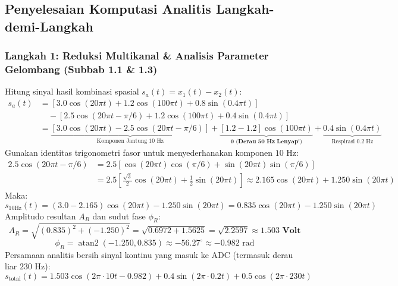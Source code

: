 \documentclass[11pt,a4paper]{article}
\begin{document}
\newpage
\subsection{Penyelesaian Komputasi Analitis Langkah-demi-Langkah}

\subsubsection{Langkah 1: Reduksi Multikanal \& Analisis Parameter Gelombang (Subbab 1.1 \& 1.3)}
Hitung sinyal hasil kombinasi spasial $s_a(t) = x_1(t) - x_2(t)$:
\begin{align*}
s_a(t) &= \left[ 3.0 \cos(20\pi t) + 1.2 \cos(100\pi t) + 0.8 \sin(0.4\pi t) \right] \\
&\quad - \left[ 2.5 \cos(20\pi t - \pi/6) + 1.2 \cos(100\pi t) + 0.4 \sin(0.4\pi t) \right] \\
&= \underbrace{\left[ 3.0 \cos(20\pi t) - 2.5 \cos(20\pi t - \pi/6) \right]}_{\text{Komponen Jantung 10 Hz}} + \underbrace{[1.2 - 1.2]\cos(100\pi t)}_{\mathbf{0\text{ (Derau 50 Hz Lenyap!)}}} + \underbrace{0.4 \sin(0.4\pi t)}_{\text{Respirasi 0.2 Hz}}
\end{align*}
Gunakan identitas trigonometri fasor untuk menyederhanakan komponen $10\text{ Hz}$:
\begin{align*}
2.5 \cos(20\pi t - \pi/6) &= 2.5 \left[ \cos(20\pi t)\cos(\pi/6) + \sin(20\pi t)\sin(\pi/6) \right] \\
&= 2.5 \left[ \frac{\sqrt{3}}{2} \cos(20\pi t) + \frac{1}{2} \sin(20\pi t) \right] \approx 2.165 \cos(20\pi t) + 1.250 \sin(20\pi t)
\end{align*}
Maka:
\begin{equation}
s_{10\text{Hz}}(t) = (3.0 - 2.165)\cos(20\pi t) - 1.250 \sin(20\pi t) = 0.835 \cos(20\pi t) - 1.250 \sin(20\pi t)
\end{equation}
Amplitudo resultan $A_R$ dan sudut fase $\phi_R$:
\begin{equation}
A_R = \sqrt{(0.835)^2 + (-1.250)^2} = \sqrt{0.6972 + 1.5625} = \sqrt{2.2597} \approx \mathbf{1.503\text{ Volt}}
\end{equation}
\begin{equation}
\phi_R = \operatorname{atan2}(-1.250, 0.835) \approx -56.27^\circ \approx -0.982\text{ rad}
\end{equation}
Persamaan analitis bersih sinyal kontinu yang masuk ke ADC (termasuk derau liar $230\text{ Hz}$):
\begin{equation}
s_{\text{total}}(t) = 1.503 \cos(2\pi \cdot 10 t - 0.982) + 0.4 \sin(2\pi \cdot 0.2 t) + 0.5 \cos(2\pi \cdot 230 t)
\end{equation}
\end{document}
